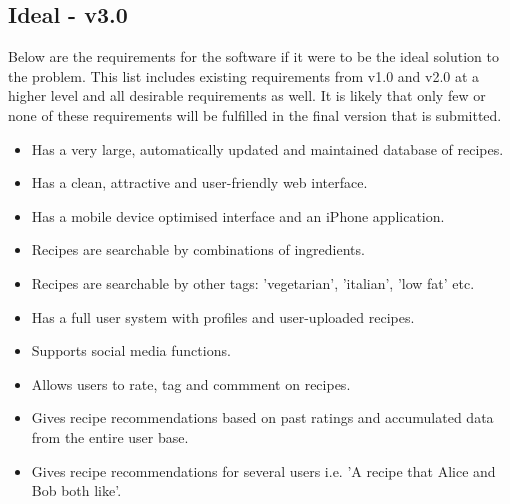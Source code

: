 \subsection{Ideal - v3.0}

Below are the requirements for the software if it were to be the ideal solution to the problem. This list includes existing requirements from v1.0 and v2.0 at a higher level and all desirable requirements as well. It is likely that only few or none
of these requirements will be fulfilled in the final version that is submitted. 

\begin{itemize}
	\item Has a very large, automatically updated and maintained database of recipes.
	\item Has a clean, attractive and user-friendly web interface.
	\item Has a mobile device optimised interface and an iPhone application.
	\item Recipes are searchable by combinations of ingredients.
	\item Recipes are searchable by other tags: 'vegetarian', 'italian', 'low fat' etc.
	\item Has a full user system with profiles and user-uploaded recipes.
	\item Supports social media functions.
	\item Allows users to rate, tag and commment on recipes.
	\item Gives recipe recommendations based on past ratings and accumulated data from the entire user base.
	\item Gives recipe recommendations for several users i.e. 'A recipe that Alice and Bob both like'.

\end{itemize}

